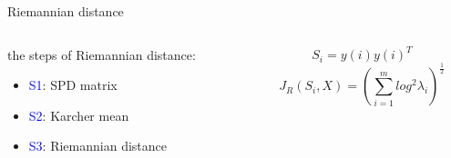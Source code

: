 \documentclass[10pt]{beamer}
\begin{document}
\begin{frame}{Riemannian distance}
   \begin{columns}
        \begin{column}{0.5\textwidth}
            the steps of Riemannian distance:
      \begin{itemize}
      \item \textcolor{blue}{S1}:   SPD matrix
      \item \textcolor{blue}{S2}:  Karcher mean
      \item \textcolor{blue}{S3}:  Riemannian distance
 	 \end{itemize}  
        \end{column}
        \begin{column}{0.5\textwidth}  %
               \begin{equation}
              S_i = y(i)y(i)^T
               \end{equation}
                \begin{equation}
                  J_R(S_i,X) =  \left(  \sum_{i=1}^mlog^2\lambda_i  \right)^\frac{1}{2}
                \end{equation}
                
        \end{column}
    \end{columns}
\end{frame}
\end{document}
